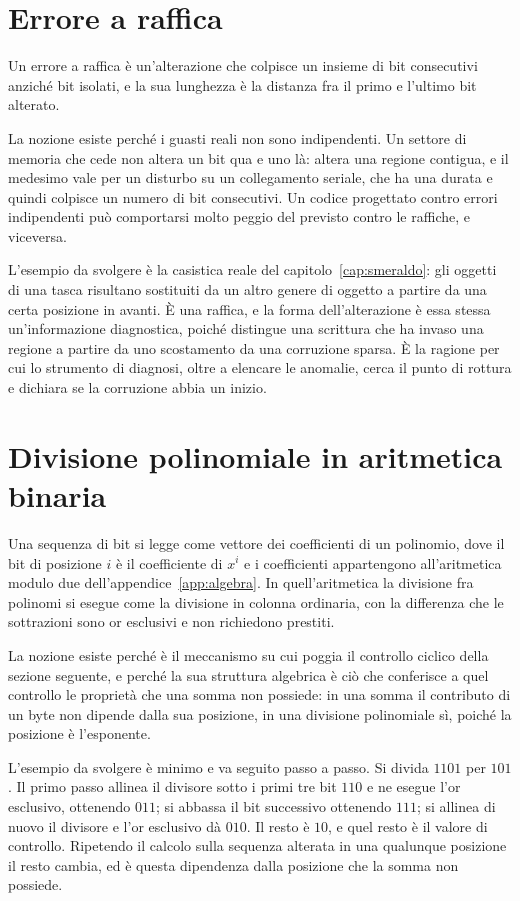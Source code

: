 \section{Errore a raffica}

Un errore a raffica è un'alterazione che colpisce un insieme di bit consecutivi anziché bit isolati, e la sua lunghezza è la distanza fra il primo e l'ultimo bit alterato.

La nozione esiste perché i guasti reali non sono indipendenti. Un settore di memoria che cede non altera un bit qua e uno là: altera una regione contigua, e il medesimo vale per un disturbo su un collegamento seriale, che ha una durata e quindi colpisce un numero di bit consecutivi. Un codice progettato contro errori indipendenti può comportarsi molto peggio del previsto contro le raffiche, e viceversa.

L'esempio da svolgere è la casistica reale del capitolo~\ref{cap:smeraldo}: gli oggetti di una tasca risultano sostituiti da un altro genere di oggetto a partire da una certa posizione in avanti. È una raffica, e la forma dell'alterazione è essa stessa un'informazione diagnostica, poiché distingue una scrittura che ha invaso una regione a partire da uno scostamento da una corruzione sparsa. È la ragione per cui lo strumento di diagnosi, oltre a elencare le anomalie, cerca il punto di rottura e dichiara se la corruzione abbia un inizio.

\section{Divisione polinomiale in aritmetica binaria}

Una sequenza di bit si legge come vettore dei coefficienti di un polinomio, dove il bit di posizione $i$ è il coefficiente di $x^i$ e i coefficienti appartengono all'aritmetica modulo due dell'appendice~\ref{app:algebra}. In quell'aritmetica la divisione fra polinomi si esegue come la divisione in colonna ordinaria, con la differenza che le sottrazioni sono or esclusivi e non richiedono prestiti.

La nozione esiste perché è il meccanismo su cui poggia il controllo ciclico della sezione seguente, e perché la sua struttura algebrica è ciò che conferisce a quel controllo le proprietà che una somma non possiede: in una somma il contributo di un byte non dipende dalla sua posizione, in una divisione polinomiale sì, poiché la posizione è l'esponente.

L'esempio da svolgere è minimo e va seguito passo a passo. Si divida $1101$ per $101$. Il primo passo allinea il divisore sotto i primi tre bit $110$ e ne esegue l'or esclusivo, ottenendo $011$; si abbassa il bit successivo ottenendo $111$; si allinea di nuovo il divisore e l'or esclusivo dà $010$. Il resto è $10$, e quel resto è il valore di controllo. Ripetendo il calcolo sulla sequenza alterata in una qualunque posizione il resto cambia, ed è questa dipendenza dalla posizione che la somma non possiede.

